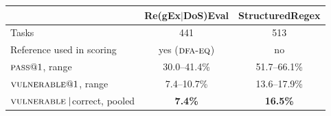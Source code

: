 \begin{tabular}{lcc}
\toprule
 & Re(gEx$|$DoS)Eval & StructuredRegex \\
\midrule
Tasks & 441 & 513 \\
Reference used in scoring     & yes ($\textsc{dfa-eq}{}$) & no \\
\midrule
$\textsc{pass}{}@1$, range & 30.0--41.4\% & 51.7--66.1\% \\
$\textsc{vulnerable}{}@1$, range & 7.4--10.7\% & 13.6--17.9\% \\
$\textsc{vulnerable}{}\mid$correct, pooled & \textbf{7.4\%} & \textbf{16.5\%} \\
\bottomrule
\end{tabular}
